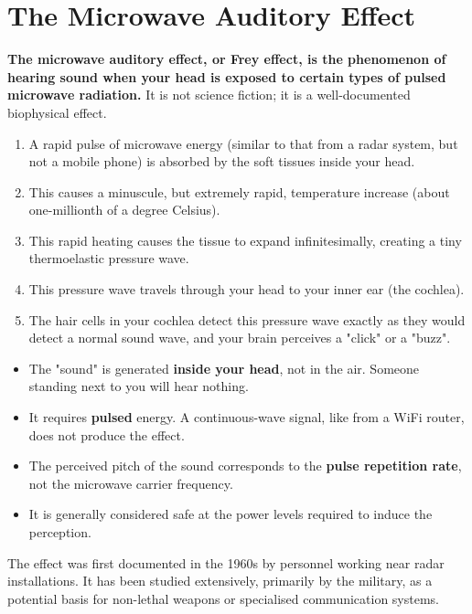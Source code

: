 
\chapter{The Microwave Auditory Effect}
\label{ch:frey-effect}

\begin{nontechnical}
    \textbf{The microwave auditory effect, or Frey effect, is the phenomenon of hearing sound when your head is exposed to certain types of pulsed microwave radiation.} It is not science fiction; it is a well-documented biophysical effect.

    \begin{enumerate}
        \item A rapid pulse of microwave energy (similar to that from a radar system, but not a mobile phone) is absorbed by the soft tissues inside your head.
        \item This causes a minuscule, but extremely rapid, temperature increase (about one-millionth of a degree Celsius).
        \item This rapid heating causes the tissue to expand infinitesimally, creating a tiny thermoelastic pressure wave.
        \item This pressure wave travels through your head to your inner ear (the cochlea).
        \item The hair cells in your cochlea detect this pressure wave exactly as they would detect a normal sound wave, and your brain perceives a "click" or a "buzz".
    \end{enumerate}

    \begin{itemize}
        \item The "sound" is generated \textbf{inside your head}, not in the air. Someone standing next to you will hear nothing.
        \item It requires \textbf{pulsed} energy. A continuous-wave signal, like from a WiFi router, does not produce the effect.
        \item The perceived pitch of the sound corresponds to the \textbf{pulse repetition rate}, not the microwave carrier frequency.
        \item It is generally considered safe at the power levels required to induce the perception.
    \end{itemize}

    The effect was first documented in the 1960s by personnel working near radar installations. It has been studied extensively, primarily by the military, as a potential basis for non-lethal weapons or specialised communication systems.
\end{nontechnical}


